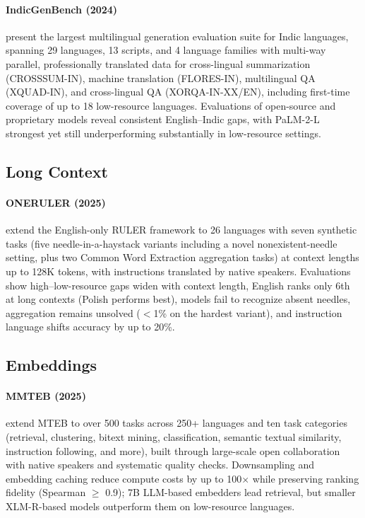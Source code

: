 \documentclass[letterpaper]{article}
\begin{document}
\paragraph{IndicGenBench (2024)} \citet{singh2024indicgenbenchmultilingualbenchmarkevaluate} present the largest multilingual generation evaluation suite for Indic languages, spanning 29 languages, 13 scripts, and 4 language families with multi-way parallel, professionally translated data for cross-lingual summarization (CROSSSUM-IN), machine translation (FLORES-IN), multilingual QA (XQUAD-IN), and cross-lingual QA (XORQA-IN-XX/EN), including first-time coverage of up to 18 low-resource languages. Evaluations of open-source and proprietary models reveal consistent English--Indic gaps, with PaLM-2-L strongest yet still underperforming substantially in low-resource settings.

\subsection{Long Context}

\paragraph{ONERULER (2025)} \citet{kim2025rulermeasureallbenchmarking} extend the English-only RULER framework to 26 languages with seven synthetic tasks (five needle-in-a-haystack variants including a novel nonexistent-needle setting, plus two Common Word Extraction aggregation tasks) at context lengths up to 128K tokens, with instructions translated by native speakers. Evaluations show high--low-resource gaps widen with context length, English ranks only 6th at long contexts (Polish performs best), models fail to recognize absent needles, aggregation remains unsolved ($<$1\% on the hardest variant), and instruction language shifts accuracy by up to 20\%.

\subsection{Embeddings}

\paragraph{MMTEB (2025)} \citet{enevoldsen2025mmtebmassivemultilingualtext} extend MTEB to over 500 tasks across 250+ languages and ten task categories (retrieval, clustering, bitext mining, classification, semantic textual similarity, instruction following, and more), built through large-scale open collaboration with native speakers and systematic quality checks. Downsampling and embedding caching reduce compute costs by up to 100$\times$ while preserving ranking fidelity (Spearman $\geq$ 0.9); 7B LLM-based embedders lead retrieval, but smaller XLM-R-based models outperform them on low-resource languages.
\end{document}
